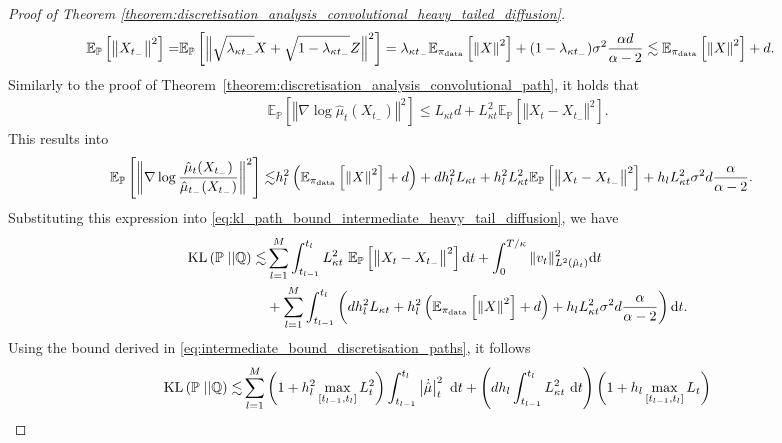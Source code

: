 \begin{proof}[Proof of Theorem \ref{theorem:discretisation_analysis_convolutional_heavy_tailed_diffusion}]
\begin{align*}
    \mathbb{E}_{\mathbb{P}}\left[\left\Vert X_{t_-}\right\Vert^2\right] =& \mathbb{E}_{\mathbb{P}}\left[\left\Vert \sqrt{\lambda_{\kappa t_-}} X + \sqrt{1-\lambda_{\kappa t_-}} Z\right\Vert^2\right] = \lambda_{\kappa t_-} \mathbb{E}_{\operatorname*{\pi_{\text{data}}}}\left[\left\Vert X\right\Vert^2\right] + (1-\lambda_{\kappa t_-})\sigma^2 \frac{\alpha d}{\alpha-2} \lesssim \mathbb{E}_{\operatorname*{\pi_{\text{data}}}}\left[\left\Vert X\right\Vert^2\right] + d.
\end{align*}
Similarly to the proof of Theorem~\ref{theorem:discretisation_analysis_convolutional_path}, it holds that 
\begin{align*}
    \mathbb{E}_{\mathbb{P}}\left[\left\Vert \nabla\log\hat{\mu}_t(X_{t_-})\right\Vert^2\right] \leq  L_{\kappa t} d  + L_{\kappa t}^2\mathbb{E}_{\mathbb{P}} \left[\left\Vert X_t-X_{t_-}\right\Vert^2\right]. 
\end{align*}
This results into
\begin{align*}
    \mathbb{E}_{\mathbb{P}} \left[\left\Vert \nabla\log \frac{\hat{\mu}_t(X_{t_-})}{\hat{\mu}_{t_-}(X_{t_-})}\right\Vert^2\right]\lesssim & h_l^2 \left(\mathbb{E}_{\operatorname*{\pi_{\text{data}}}}\left[\left\Vert X\right\Vert^2\right] + d\right) + d h_l^2 L_{\kappa t}+ h_l^2 L_{\kappa t}^2 \mathbb{E}_{\mathbb{P}} \left[\left\Vert X_t-X_{t_-}\right\Vert^2\right]  +h_l L_{\kappa t}^2\sigma^2 d \frac{\alpha}{\alpha-2}.
\end{align*}
Substituting this expression into \eqref{eq:kl_path_bound_intermediate_heavy_tail_diffusion}, we have
\begin{align*}
    \kl\left(\mathbb{P}\;||\mathbb{Q}\right)\lesssim& \sum_{l=1}^M\int_{t_{l-1}}^{t_l} L_{\kappa t}^2 \ \mathbb{E}_{\mathbb{P}} \left[\left\Vert X_t-X_{t_-}\right\Vert^2\right]\md t+ \int_0^{T/\kappa} \Vert v_t\Vert^2_{L^2({\hat{\mu}}_t)} \md t\\
    &+ \sum_{l=1}^M\int_{t_{l-1}}^{t_l} \left(d h_l^2 L_{\kappa t} + h_l^2 \left(\mathbb{E}_{\pid}\left[\left\Vert X\right\Vert^2\right] + d\right) +h_l L_{\kappa t}^2\sigma^2 d \frac{\alpha}{\alpha-2}\right) \md t.
\end{align*}
Using the bound derived in \eqref{eq:intermediate_bound_discretisation_paths}, it follows
\begin{align*}
    \kl\left(\mathbb{P}\;||\mathbb{Q}\right)\lesssim& \sum_{l=1}^M \left( 1 + h_l^2\max_{[t_{l-1}, t_l]} L_{t}^2\right)
   \int_{t_{l-1}}^{t_l} \left\vert\Dot{\hat{\mu}}\right\vert_t^2\ \md t + \left(d h_l\int_{t_{l-1}}^{t_l} L_{\kappa t}^2 \ \md t\right) \left(1 + h_l\max_{[t_{l-1}, t_l]} L_{t}\right) \\

\end{align*}
\end{proof}
